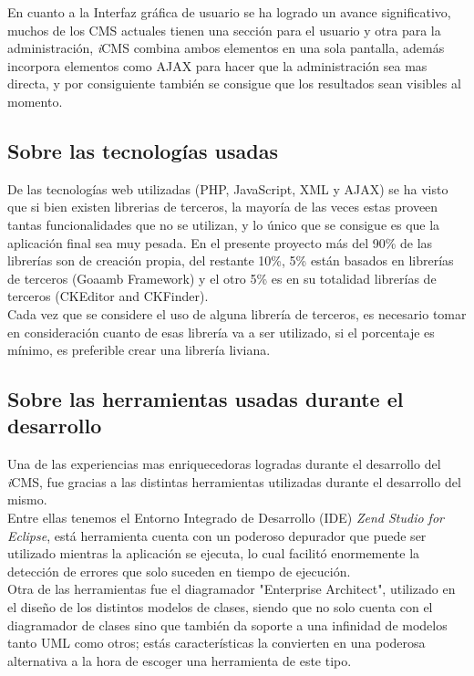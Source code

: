 En cuanto a la Interfaz gr\'afica de usuario se ha logrado un avance significativo, muchos de los CMS actuales tienen una secci\'on para el usuario y otra para la administraci\'on, \textit{i}CMS combina ambos elementos en una sola pantalla, adem\'as incorpora elementos como AJAX para hacer que la administraci\'on sea mas directa, y por consiguiente tambi\'en se consigue que los resultados sean visibles al momento.


\subsection{Sobre las tecnolog\'ias usadas}
De las tecnolog\'ias web utilizadas (PHP, JavaScript, XML y AJAX) se ha visto que si bien existen librerias de terceros, la mayor\'ia de las veces estas proveen tantas funcionalidades que no se utilizan, y lo \'unico que se consigue es que la aplicaci\'on final sea muy pesada. En el presente proyecto m\'as del 90\% de las librer\'ias son de creaci\'on propia, del restante 10\%, 5\% est\'an basados en librer\'ias de terceros (Goaamb Framework) y el otro 5\% es en su totalidad librer\'ias de terceros (CKEditor and CKFinder).\\
Cada vez que se considere el uso de alguna librer\'ia de terceros, es necesario tomar en consideraci\'on cuanto de esas librer\'ia va a ser utilizado, si el porcentaje es m\'inimo, es preferible crear una librer\'ia liviana. 

\subsection{Sobre las herramientas usadas durante el desarrollo}
Una de las experiencias mas enriquecedoras logradas durante el desarrollo del \textit{i}CMS, fue gracias a las distintas herramientas utilizadas durante el desarrollo del mismo.\\ Entre ellas tenemos el Entorno Integrado de Desarrollo (IDE) \emph{Zend Studio for Eclipse}, est\'a herramienta cuenta con un poderoso depurador que puede ser utilizado mientras la aplicaci\'on se ejecuta, lo cual facilit\'o enormemente la detecci\'on de errores que solo suceden en tiempo de ejecuci\'on.\\
Otra de las herramientas fue el diagramador "Enterprise Architect", utilizado en el dise\~no de los distintos modelos de clases, siendo que no solo cuenta con el diagramador de clases sino que tambi\'en da soporte a una infinidad de modelos tanto UML como otros; est\'as caracter\'isticas la convierten en una poderosa alternativa a la hora de escoger una herramienta de este tipo.

